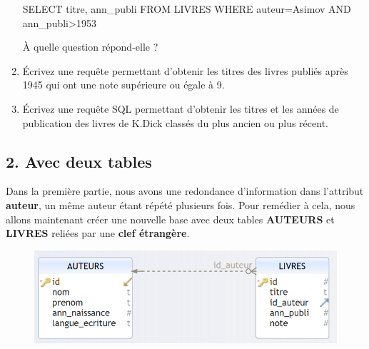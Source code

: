 \documentclass[
  letterpaper,
  DIV=11,
  numbers=noendperiod]{scrartcl}
\newenvironment{Shaded}{\begin{snugshade}}{\end{snugshade}}
\newcommand{\DecValTok}[1]{\textcolor[rgb]{0.68,0.00,0.00}{#1}}
\newcommand{\KeywordTok}[1]{\textcolor[rgb]{0.00,0.23,0.31}{#1}}
\newcommand{\NormalTok}[1]{\textcolor[rgb]{0.00,0.23,0.31}{#1}}
\newcommand{\OperatorTok}[1]{\textcolor[rgb]{0.37,0.37,0.37}{#1}}
\newcommand{\StringTok}[1]{\textcolor[rgb]{0.13,0.47,0.30}{#1}}
\begin{document}
\begin{enumerate}
\begin{Shaded}
\begin{Highlighting}[]
\KeywordTok{SELECT}\NormalTok{ titre, ann\_publi}
\KeywordTok{FROM}\NormalTok{ LIVRES}
\KeywordTok{WHERE}\NormalTok{ auteur}\OperatorTok{=}\StringTok{\textquotesingle{}Asimov\textquotesingle{}} \KeywordTok{AND}\NormalTok{ ann\_publi}\OperatorTok{\textgreater{}}\DecValTok{1953}
\end{Highlighting}
\end{Shaded}

  À quelle question répond-elle ?
\item
  Écrivez une requête permettant d'obtenir les titres des livres publiés
  après 1945 qui ont une note supérieure ou égale à 9.
\item
  Écrivez une requête SQL permettant d'obtenir les titres et les années
  de publication des livres de K.Dick classés du plus ancien ou plus
  récent.
\end{enumerate}

\hypertarget{avec-deux-tables}{%
\subsection{2. Avec deux tables}\label{avec-deux-tables}}

Dans la première partie, nous avons une redondance d'information dans
l'attribut \textbf{auteur}, un même auteur étant répété plusieurs fois.
Pour remédier à cela, nous allons maintenant créer une nouvelle base
avec deux tables \textbf{AUTEURS} et \textbf{LIVRES} reliées par une
\textbf{clef étrangère}.

\begin{figure}

{\centering \includegraphics{TP1_8.png}

}

\end{figure}
\end{document}
